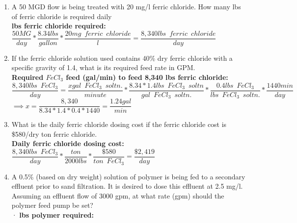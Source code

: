 \documentclass{article}
\begin{document}
\begin{enumerate}
\vspace{0.25cm}
\item A 50 MGD flow is being treated with 20 mg/l ferric chloride.   How many lbs of ferric chloride is required daily \\
\vspace{0.3cm}
\textbf{lbs ferric chloride required:}\\
$\dfrac{50 MG}{day}*\dfrac{8.34lbs}{gallon}*\dfrac{20mg \enspace ferric \enspace chloride}{l}=\boxed{\dfrac{8,340 lbs \enspace ferric \enspace chloride}{day}}$\\
\vspace{0.25cm}
\item If the ferric chloride solution used contains 40\% dry ferric chloride with a specific gravity of 1.4, what is its required feed rate in GPM.\\
\vspace{0.25cm}
\textbf{Required $FeCl_3$ feed (gal/min) to feed 8,340 lbs ferric chloride:}\\
\vspace{0.25cm}
$\dfrac{8,340 lbs \enspace FeCl_3}{day}=\dfrac{x gal \enspace FeCl_3 \enspace soltn.}{minute}*\dfrac{8.34*1.4 lbs \enspace FeCl_3 \enspace soltn}{gal \enspace FeCl_3 \enspace soltn.}*\dfrac{0.4 lbs \enspace FeCl_3}{lbs \enspace FeCl_3 \enspace soltn.}*\dfrac{1440min}{day}$\\
\vspace{0.25cm}
$\implies x=\dfrac{8,340}{8.34*1.4*0.4*1440}=\boxed{\dfrac{1.24gal}{min}}$\\
\vspace{0.25cm}
\item What is the daily ferric chloride dosing cost if the ferric chloride cost is \$580/dry ton ferric chloride.\\
\textbf{Daily ferric chloride dosing cost:}\\
\vspace{0.25cm}
$\dfrac{8,340lbs \enspace FeCl_3}{day}*\dfrac{ton}{2000 lbs}*\dfrac{\$580}{ton \enspace FeCl_3}=\boxed{\dfrac{\$2,419}{day}}$
\vspace{0.25cm}
\item A 0.5\% (based on dry weight) solution of polymer is being fed to a secondary effluent prior to sand filtration. It is desired to dose this effluent at 2.5 mg/l. Assuming an effluent flow of 3000 gpm, at what rate (gpm)  should  the polymer feed pump be set?\\	·
\vspace{0.25cm}
\textbf{lbs polymer required:}\\

\end{enumerate}
\end{document}
